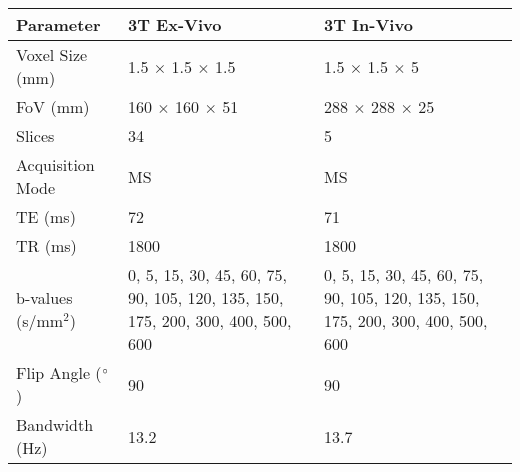\begin{table}[H]
	\centering
	\begin{tabularx}{1.0\textwidth}{X|X|X}
	\textbf{Parameter}                      & \textbf{3T Ex-Vivo}                                                              & \textbf{3T In-Vivo}                                                              \\ \hline
	Voxel Size (mm)                         & 1.5 $\times$ 1.5 $\times$ 1.5                                                                  & 1.5 $\times$ 1.5 $\times$ 5                                                                    \\ \hline
	FoV (mm)                                & 160 $\times$ 160 $\times$ 51                                                                   & 288 $\times$ 288 $\times$ 25                                                                   \\ \hline
	Slices                                  & 34                                                                               & 5                                                                                \\ \hline
	Acquisition Mode                        & MS                                                                               & MS                                                                               \\ \hline
	TE (ms)                                 & 72                                                                               & 71                                                                               \\ \hline
	TR (ms)                                 & 1800                                                                             & 1800                                                                             \\ \hline
	b-values (s/mm$^2$)                     & 0, 5, 15, 30, 45, 60, 75, 90, 105, 120, 135, 150, 175,   200, 300, 400, 500, 600 & 0, 5, 15, 30, 45, 60, 75, 90, 105, 120, 135, 150, 175,   200, 300, 400, 500, 600 \\ \hline
	Flip Angle ($\degree$)                  & 90                                                                               & 90                                                                               \\ \hline
	Bandwidth (Hz)                          & 13.2                                                                             & 13.7                                                                             \\ \hline

\end{tabularx}
\end{table}
